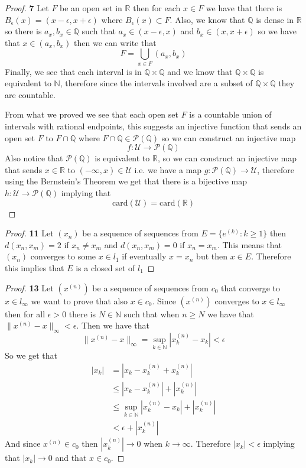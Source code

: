 \documentclass[11pt]{article}
\newcommand{\N}{\mathbb{N}}
\newcommand{\Q}{\mathbb{Q}}
\newcommand{\R}{\mathbb{R}}
\theoremstyle{definition}
\begin{document}
\cleardoublepage
	\begin{proof}{\textbf{7}}
        Let $F$ be an open set in $\R$ then for each $x \in F$ we have that there is
        $B_\epsilon(x) = (x-\epsilon, x+\epsilon)$ where $B_\epsilon(x) \subset F$. Also,
        we know that $\Q$ is dense in $\R$ so there is $a_x,b_x \in \Q$
        such that $a_x \in (x-\epsilon, x)$ and $b_x \in (x, x + \epsilon)$ so we have
        that $x \in (a_x, b_x)$ then we can write that
        $$F = \bigcup_{x \in F} (a_x,b_x)$$
        Finally, we see that each interval is in $\Q \times \Q$ and we know that
        $\Q \times \Q$ is equivalent to $\N$, therefore since the intervals involved are
        a subset of $\Q \times \Q$ they are countable.
        
        From what we proved we see that each open set $F$ is a countable union of
        intervals with rational endpoints, this suggests an injective function that
        sends an open set $F$ to  $F\cap\Q$ where $F \cap \Q \in \mathcal{P}(\Q)$
        so we can construct an injective map
        $$f: \mathcal{U} \to \mathcal{P}(\Q)$$
        Also notice that $\mathcal{P}(\Q)$ is equivalent to $\R$, so we can construct an
        injective map that sends $x \in \R$ to $(-\infty, x) \in\mathcal{U}$ i.e.
        we have a map $g: \mathcal{P}(\Q) \to \mathcal{U}$,
        therefore using the Bernstein's Theorem we get that there is a bijective map
        $h:\mathcal{U} \to \mathcal{P}(\Q)$ implying that
        $$\text{card}(\mathcal{U}) = \text{card}(\R)$$
    \end{proof}
	\begin{proof}{\textbf{11}}
        Let $(x_n)$ be a sequence of sequences from $E = \{e^{(k)}: k\geq 1\}$ then
        $d(x_n, x_m) = 2$ if $x_n \neq x_m$ and $d(x_n, x_m) = 0 $ if $x_n = x_m$. This
        means that $(x_n)$ converges to some $x \in l_1$ if eventually $x = x_n$ but
        then $x \in E$. Therefore this implies that $E$ is a closed set of $l_1$ 
    \end{proof}
	\begin{proof}{\textbf{13}}
        Let $(x^{(n)})$ be a sequence of sequences from $c_0$ that converge to
        $x \in l_\infty$ we want to prove that also $x \in c_0$.
        Since $(x^{(n)})$ converges to $x \in l_\infty$ then for all $\epsilon > 0$ 
        there is $N \in \N$ such that when $n \geq N$ we have that
        $\|x^{(n)} - x\|_\infty < \epsilon$.
        Then we have that
        $$\|x^{(n)} - x\|_\infty = \sup_{k \in \N}|x^{(n)}_k - x_k|< \epsilon$$
        So we get that
        \begin{align*}
            |x_k| &= |x_k - x_k^{(n)} + x_k^{(n)}|\\
            &\leq |x_k - x_k^{(n)}| + |x_k^{(n)}|\\
            &\leq \sup_{k \in \N}|x^{(n)}_k - x_k| + |x^{(n)}_k|\\
            &< \epsilon + |x^{(n)}_k|
        \end{align*}
        And since $x^{(n)} \in c_0$ then $|x^{(n)}_k| \to 0$ when $k \to \infty$.
        Therefore $|x_k| < \epsilon$ implying that $|x_k| \to 0$ and that $x \in c_0$. 
    \end{proof}
\end{document}
